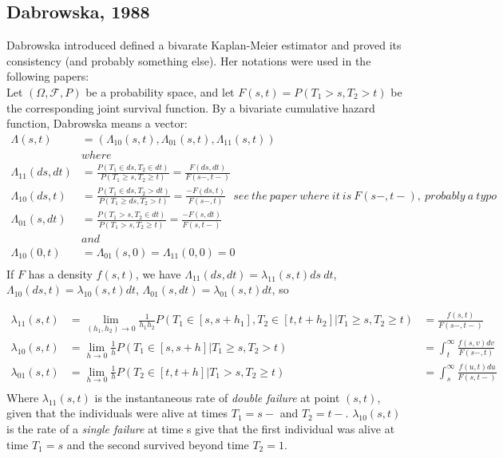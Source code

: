 \documentclass[]{article}
\begin{document}
\subsection{Dabrowska, 1988 \cite{dabrowska1988kaplan}}
Dabrowska introduced defined a bivarate Kaplan-Meier estimator and proved its consistency (and probably something else). Her notations were used in the following papers:\\
Let $(\Omega, \mathcal{F}, P)$ be a probability space, and let $F(s,t) = P(T_1>s, T_2>t)$ be the corresponding joint survival function. By a bivariate cumulative hazard function, Dabrowska means a vector:
	$$
	\begin{aligned}
		\Lambda(s,t) &= (\Lambda_{10}(s,t), \Lambda_{01}(s,t), \Lambda_{11}(s,t))\\
		&where\\
		\Lambda_{11}(ds,dt) &= \frac{P(T_1 \in ds, T_2\in dt)}{P(T_1 \geq s, T_2 \geq t)} = \frac{F(ds, dt)}{F(s-, t-)}\\
		\Lambda_{10}(ds,t) &= \frac{P(T_1 \in ds, T_2 > dt)}{P(T_1 \geq ds, T_2 > t)} = \frac{-F(ds, t)}{F(s-, t)}~~~see ~the~paper~where ~it~is~F(s-, t-),~probably~a~typo\\ 
		\Lambda_{01}(s,dt) &= \frac{P(T_1 > s, T_2\in dt)}{P(T_1 > s, T_2 \geq t)} = \frac{-F(s, dt)}{F(s, t-)}\\
		&and\\
		\Lambda_{10}(0,t) &= \Lambda_{01}(s,0) = \Lambda_{11}(0,0) = 0\\
	\end{aligned}
	$$
If $F$ has a density $f(s,t)$, we have $\Lambda_{11}(ds,dt) = \lambda_{11}(s,t)ds~dt$, $\Lambda_{10}(ds,t) = \lambda_{10}(s,t)dt$, $\Lambda_{01}(s,dt) = \lambda_{01}(s,t)dt$, so

	$$
	\begin{aligned}
		\lambda_{11}(s,t) &= \lim_{(h_1,h_2)\rightarrow 0} \frac{1}{h_1 h_2} P(T_1\in[s,s+h_1], T_2\in[t,t+h_2] | T_1\geq s, T_2 \geq t) & = \frac{f(s,t)}{F(s-, t-)}\\
		\lambda_{10}(s,t) &= \lim_{h\rightarrow 0} \frac{1}{h} P(T_1\in[s,s+h] | T_1\geq s, T_2 > t) & = \int_t^{\infty} \frac{f(s,v)dv}{F(s-, t)}\\
		\lambda_{01}(s,t) &= \lim_{h\rightarrow 0} \frac{1}{h} P(T_2\in[t,t+h] | T_1 > s, T_2 \geq t) & = \int_s^{\infty} \frac{f(u,t)du}{F(s, t-)}\\
	\end{aligned}
	$$
Where $\lambda_{11}(s,t)$ is the instantaneous rate of \emph{double failure} at point $(s,t)$, given that the individuals were alive at times $T_1=s-$ and $T_2 = t-$. $\lambda_10(s, t)$ is the rate of a \emph{single failure} at time s give that the first individual was alive at time $T_1=s$ and the second survived beyond time $T_2 = 1$.\\
\end{document}
